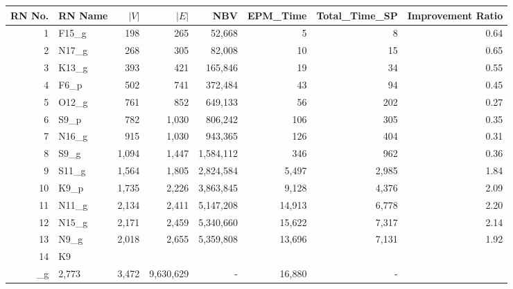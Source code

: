 \begin{tabular}{rlrrrrrr}
\toprule
 RN No. & RN Name & $|V|$ & $|E|$ &       NBV & EPM_Time & Total_Time_SP & Improvement Ratio \\
\midrule
      1 &  F15\_g &   198 &   265 &    52,668 &        5 &             8 &              0.64 \\
      2 &  N17\_g &   268 &   305 &    82,008 &       10 &            15 &              0.65 \\
      3 &  K13\_g &   393 &   421 &   165,846 &       19 &            34 &              0.55 \\
      4 &   F6\_p &   502 &   741 &   372,484 &       43 &            94 &              0.45 \\
      5 &  O12\_g &   761 &   852 &   649,133 &       56 &           202 &              0.27 \\
      6 &   S9\_p &   782 & 1,030 &   806,242 &      106 &           305 &              0.35 \\
      7 &  N16\_g &   915 & 1,030 &   943,365 &      126 &           404 &              0.31 \\
      8 &   S9\_g & 1,094 & 1,447 & 1,584,112 &      346 &           962 &              0.36 \\
      9 &  S11\_g & 1,564 & 1,805 & 2,824,584 &    5,497 &         2,985 &              1.84 \\
     10 &   K9\_p & 1,735 & 2,226 & 3,863,845 &    9,128 &         4,376 &              2.09 \\
     11 &  N11\_g & 2,134 & 2,411 & 5,147,208 &   14,913 &         6,778 &              2.20 \\
     12 &  N15\_g & 2,171 & 2,459 & 5,340,660 &   15,622 &         7,317 &              2.14 \\
     13 &   N9\_g & 2,018 & 2,655 & 5,359,808 &   13,696 &         7,131 &              1.92 \\
     14 &  K9\\_g & 2,773 & 3,472 & 9,630,629 &        - &        16,880 &                 - \\
\bottomrule
\end{tabular}
